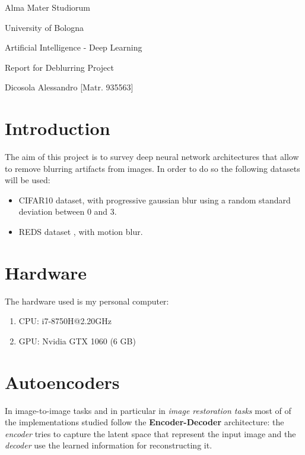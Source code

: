 \documentclass{article}
\begin{document}
\begin{titlepage}
    \vspace*{1cm}

    \begin{center}
        \Huge{Alma Mater Studiorum 
        
        University of Bologna }
    \end{center}

    \vspace*{5 cm}
    \begin{center}
        \LARGE{Artificial Intelligence - Deep Learning}

        \Large Report for Deblurring Project

        \large {Dicosola Alessandro [Matr. 935563]}
    \end{center}
\end{titlepage}

\section{Introduction}
The aim of this project is to survey deep neural network architectures that allow to remove blurring artifacts from images.
\newline
In order to do so the following datasets will be used:
\begin{itemize}
    \item CIFAR10 \cite{cifar10dataset} dataset, with progressive gaussian blur using a random standard deviation between 0 and 3.
    \item REDS\cite{redsdataset} dataset , with motion blur.
\end{itemize}
\section{Hardware}
The hardware used is my personal computer:
\begin{enumerate}
    \item CPU: i7-8750H@2.20GHz
    \item GPU: Nvidia GTX 1060 (6 GB)
\end{enumerate}

\section{Autoencoders}
In image-to-image tasks and in particular in \textit{image restoration tasks} most of of the implementations studied follow the \textbf{Encoder-Decoder} architecture: the \textit{encoder} tries to capture the latent space that represent the input image and the \textit{decoder} use the learned information for reconstructing it.
\end{document}
